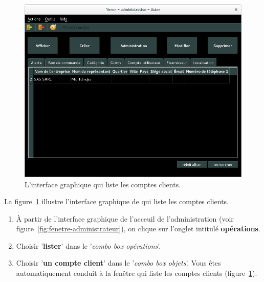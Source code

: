\begin{figure}[!htpb]
	\centering
	\includegraphics[scale=0.45]{images/compte-client-lister.png}
	\caption{L'interface graphique qui liste les comptes clients.}
	\label{fig:admin-comptes-clients-lister}
\end{figure}

La figure~\ref{fig:admin-comptes-clients-lister} illustre
l'interface graphique de \yeroth qui liste les comptes clients.

\begin{enumerate}[1)]
	\item \`A partir de l'interface graphique de l'acceuil de
		l'administration (voir figure~\ref{fig:fenetre-administrateur}),
		on clique sur l'onglet intitul\'e \textbf{op\'erations}. 
		
	\item Choisir '\textbf{lister}' dans le '\emph{combo box
		op\'erations}'.
		
	\item Choisir '\textbf{un compte client}' dans
		le '\emph{combo box objets}'. Vous \^etes automatiquement
		conduit \`a la fen\^etre qui liste les comptes clients
		(figure~\ref{fig:admin-comptes-clients-lister}).
\end{enumerate}


\newpage
{}


